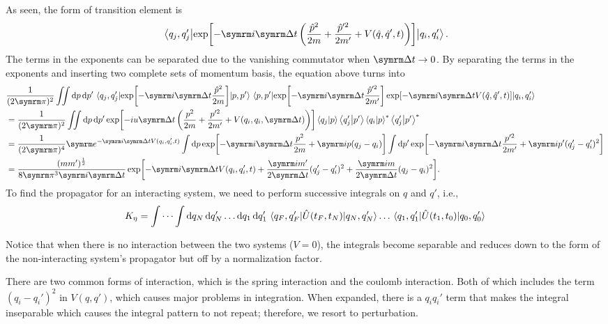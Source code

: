 As seen, the form of transition element is
\begin{equation}
    \mel{q_j, q_j'}{\exp[-\im\Dd{t}\left(\frac{\hat{p}^2}{2m} + \frac{\hat{p}'^2}{2m'} + V(\hat{q}, \hat{q}', t)\right)]}{q_i, q_i'}.
\end{equation}
The terms in the exponents can be separated due to the vanishing commutator when $\Dd{t} \appr 0$. By separating the terms in the exponents and inserting two complete sets of momentum basis, the equation above turns into
\begin{align}
    & \frac{1}{(2\cpi)^2} \iint\dd{p}\dd{p'} \mel*{q_j, q_j'}{\exp[-\im\Dd{t}\frac{\hat{p}^2}{2m}]}{p, p'}\mel{p, p'}{\exp[-\im\Dd{t}\frac{\hat{p}'^2}{2m'}]\exp[-\im\Dd{t}V(\hat{q}, \hat{q}', t)]}{q_i, q_i'} \nonumber\\
    &= \frac{1}{(2\cpi)^2} \iint\dd{p}\dd{p'} \exp[-iu\Dd{t}\left(\frac{p^2}{2m} + \frac{p'^2}{2m'} + V(q_i, q_i, \Dd{t})\right)]\braket{q_j}{p}\braket{q_j'}{p'}\braket{q_i}{p}\conj\braket{q_j'}{p'}\conj \nonumber\\
    &= \frac{1}{(2\cpi)^4} \e^{-\im\Dd{t}V(q_i, q_i', t)} \int\dd{p}\exp[-\im\Dd{t}\frac{p^2}{2m} + \im p(q_j - q_i)]\int\dd{p'}\exp[-\im\Dd{t}\frac{p'^2}{2m'} + \im p'(q_j' - q_i')^2] \nonumber\\
    &= \frac{(mm')^{\frac{1}{2}}}{8\cpi^3\im\Dd{t}}\exp[-\im\Dd{t}V(q_i, q_i', t) + \frac{\im m'}{2\Dd{t}}(q_j' - q_i')^2 + \frac{\im m}{2\Dd{t}}(q_j - q_i)^2].
\end{align}
To find the propagator for an interacting system, we need to perform successive integrals on $q$ and $q'$, i.e.,
\begin{equation}
    K_{\eta} = \idotsint \dd{q_N}\dd{q_N'}\dots\dd{q_1}\dd{q_1'}\mel{q_F, q_F'}{\hat{U}(t_F, t_N)}{q_N, q_N'}\dots\mel{q_1, q_1'}{\hat{U}(t_1, t_0)}{q_0, q_0'}
\end{equation}

Notice that when there is no interaction between the two systems ($V = 0$), the integrals become separable and reduces down to the form of the non-interacting system's propagator but off by a normalization factor.

There are two common forms of interaction, which is the spring interaction and the coulomb interaction. Both of which includes the term $(q_i - q_i')^2$ in $V(q, q')$, which causes major problems in integration. When expanded, there is a $q_iq_i'$ term that makes the integral inseparable which causes the integral pattern to not repeat; therefore, we resort to perturbation.


